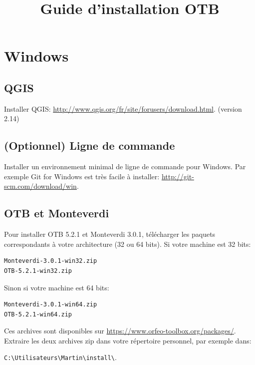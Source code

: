 \documentclass[10pt,a4paper]{article}
\title{Guide d'installation OTB}
\begin{document}
\maketitle

\section{Windows}

\subsection{QGIS}
Installer QGIS: \url{http://www.qgis.org/fr/site/forusers/download.html}.
(version 2.14)
\subsection{(Optionnel) Ligne de commande}
Installer un environnement minimal de ligne de commande pour Windows. Par exemple
Git for Windows est très facile à installer:
\url{http://git-scm.com/download/win}.

\subsection{OTB et Monteverdi}
Pour installer OTB 5.2.1 et Monteverdi 3.0.1, télécharger les paquets
correspondants à votre architecture (32 ou 64 bits). Si votre machine est 32
bits:

\begin{verbatim}
Monteverdi-3.0.1-win32.zip
OTB-5.2.1-win32.zip
\end{verbatim}

Sinon si votre machine est 64 bits:

\begin{verbatim}
Monteverdi-3.0.1-win64.zip
OTB-5.2.1-win64.zip
\end{verbatim}

Ces archives sont disponibles sur \url{https://www.orfeo-toolbox.org/packages/}.
Extraire les deux archives zip dans votre répertoire personnel, par exemple dans:\\
\begin{centering}
\texttt{C:{\textbackslash}Utilisateurs{\textbackslash}Martin{\textbackslash}install{\textbackslash}}.
\end{centering}
\end{document}
